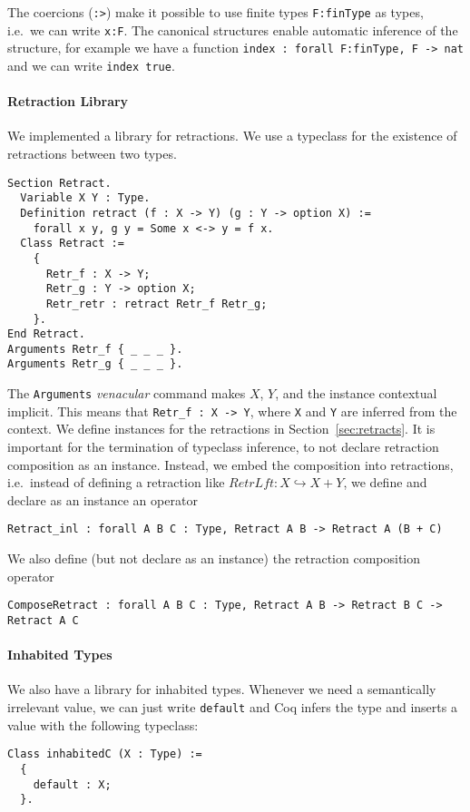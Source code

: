 The coercions (\lstinline!:>!) make it possible to use finite types \lstinline{F:finType} as types, i.e.\ we can write \lstinline!x:F!.  The canonical
structures enable automatic inference of the structure, for example we have a function \lstinline!index : forall F:finType, F -> nat! and we can write
\lstinline!index true!.

\paragraph{Retraction Library}

We implemented a library for retractions.  We use a typeclass for the existence of retractions between two types.
\begin{lstlisting}
Section Retract.
  Variable X Y : Type.
  Definition retract (f : X -> Y) (g : Y -> option X) :=
    forall x y, g y = Some x <-> y = f x.
  Class Retract :=
    {
      Retr_f : X -> Y;
      Retr_g : Y -> option X;
      Retr_retr : retract Retr_f Retr_g;
    }.
End Retract.
Arguments Retr_f { _ _ _ }.
Arguments Retr_g { _ _ _ }.
\end{lstlisting}
The \lstinline!Arguments! \textit{venacular} command makes $X$, $Y$, and the instance contextual implicit.  This means that
\lstinline!Retr_f : X -> Y!, where \lstinline!X! and \lstinline!Y! are inferred from the context.  We define instances for the retractions in
Section~\ref{sec:retracts}.  It is important for the termination of typeclass inference, to not declare retraction composition as an instance.
Instead, we embed the composition into retractions, i.e.\ instead of defining a retraction like $RetrLft : X \hookrightarrow X+Y$, we define and
declare as an instance an operator
\begin{lstlisting}
Retract_inl : forall A B C : Type, Retract A B -> Retract A (B + C)
\end{lstlisting}
We also define (but not declare as an instance) the retraction composition operator
\begin{lstlisting}
ComposeRetract : forall A B C : Type, Retract A B -> Retract B C -> Retract A C
\end{lstlisting}

\paragraph{Inhabited Types}

We also have a library for inhabited types.  Whenever we need a semantically irrelevant value, we can just write \lstinline!default! and Coq infers
the type and inserts a value with the following typeclass:
\begin{lstlisting}
Class inhabitedC (X : Type) :=
  {
    default : X;
  }.
\end{lstlisting}

